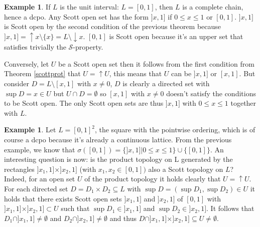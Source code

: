 \documentclass[a4paper,12pt]{article}
\theoremstyle{definition}
\newtheorem{example}[theorem]{Example}
\begin{document}
\begin{example}
If $L$ is the unit interval: $L = [0,1]$, then $L$ is a complete chain, hence a dcpo.  Any Scott open set has the form $]x,1]$ if $0 \leq x \leq 1$ or $[0, 1]$. $]x, 1]$ is Scott open by the second condition of the previous theorem because $]x, 1] = \uparrow x \setminus \{x\} = L \setminus \downarrow x$. $[0,1]$ is Scott open because it's an upper set that satisfies trivially the $\mathcal{S}$-property.

Conversely, let $U$ be a Scott open set then it follows from the first condition from Theorem \ref{scottprot} that $U = \uparrow U$, this means that $U$ can be $]x, 1]$ or $[x, 1]$. But consider $D = L \setminus [x, 1]$ with $x \neq 0$, $D$ is clearly a directed set with $\sup D = x \in U$ but $U \cap D = \emptyset$ so $[x, 1]$ with $x \neq 0$ doesn't satisfy the conditions to be Scott open. The only Scott open sets are thus $]x, 1]$ with $0 \leq x \leq 1$ together with $L$.
\end{example}

\begin{example}
Let $L = [0, 1]^2$, the square with the pointwise ordering, which is of course a dcpo because it's already a continuous lattice. From the previous example, we know that $\sigma([0,1]) = \{]x, 1] | 0 \leq x \leq 1 \} \cup \{[0,1]\}$. An interesting question is now: is the product topology on L generated by the rectangles $]x_1, 1] \times ]x_2, 1]$ (with $x_1, x_2 \in [0, 1])$ also a Scott topology on $L$? Indeed, for an open set $U$ of the product topology it holds clearly that $U = \uparrow U$. For each directed set $D = D_1 \times D_2 \subseteq L$ with $\sup D = (\sup D_1, \sup D_2) \in U$ it holds that there exists Scott open sets $]x_1, 1]$ and $]x_2, 1]$ of $[0, 1]$ with $]x_1, 1] \times ]x_2, 1] \subset U$ such that $\sup D_1 \in ]x_1, 1]$ and $\sup D_2 \in ]x_2, 1]$. It follows that $D_1 \cap ]x_1, 1] \neq \emptyset$ and $D_2 \cap ]x_2, 1] \neq \emptyset$ and thus $D \cap ]x_1, 1] \times ]x_2, 1] \subseteq U \neq \emptyset$.
\end{example}
\end{document}
